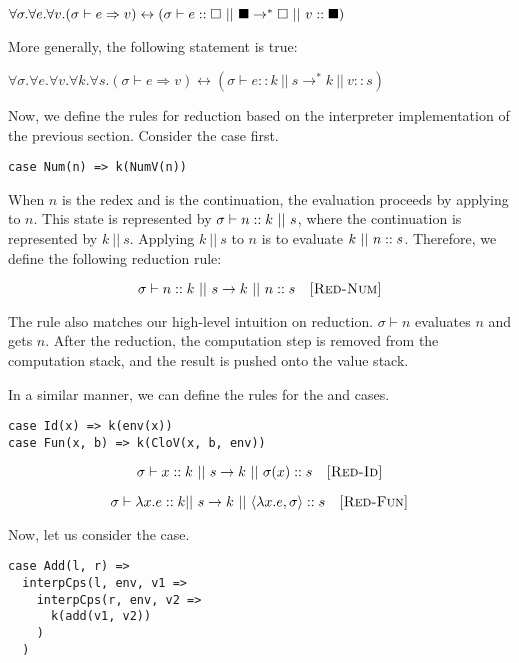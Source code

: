 $\forall \sigma.\forall e.\forall v.(\sigma\vdash e\Rightarrow
v)\leftrightarrow(\sigma\vdash e:: \square\ ||\
\blacksquare\rightarrow^\ast\square\ ||\ v::\blacksquare)$

More generally, the following statement is true:

$\forall \sigma.\forall e.\forall v.\forall k.\forall s.(\sigma\vdash
e\Rightarrow v)\leftrightarrow(\sigma\vdash e::k\ ||\
s\rightarrow^\ast k\ ||\ v::s)$

Now, we define the rules for reduction based on the interpreter implementation
of the previous section. Consider the  case first.

\begin{verbatim}
case Num(n) => k(NumV(n))
\end{verbatim}

When $n$ is the redex and  is the continuation, the evaluation proceeds
by applying  to $n$. This state is represented by $\sigma\vdash n::k\
||\ s$, where the continuation  is represented by $k\ ||\ s$.
Applying $k\ ||\ s$ to $n$ is to evaluate $k\ ||\ n::s$. Therefore, we
define the following reduction rule:

\[
  \evalkd{n}k\ ||\ s\rightarrow k\ ||\ \conss{n}s
  \quad\textsc{[Red-Num]}
\]

The rule also matches our high-level intuition on reduction.
$\sigma\vdash n$ evaluates $n$ and gets $n$. After the reduction, the
computation step is removed from the computation stack, and the result is pushed
onto the value stack.

In a similar manner, we can define the rules for the \code{Id} and \code{Fun}
cases.

\begin{verbatim}
case Id(x) => k(env(x))
case Fun(x, b) => k(CloV(x, b, env))
\end{verbatim}

\[
  \evalkd{x}k\ ||\ s\rightarrow k\ ||\ \conss{\sigma(x)}s
  \quad\textsc{[Red-Id]}
\]

\[
  \sigma\vdash\lambda x.e::k ||\ s\rightarrow k\ ||\ \langle\lambda x.e,\sigma\rangle::s
  \quad\textsc{[Red-Fun]}
\]

Now, let us consider the  case.

\begin{verbatim}
case Add(l, r) =>
  interpCps(l, env, v1 =>
    interpCps(r, env, v2 =>
      k(add(v1, v2))
    )
  )
\end{verbatim}

